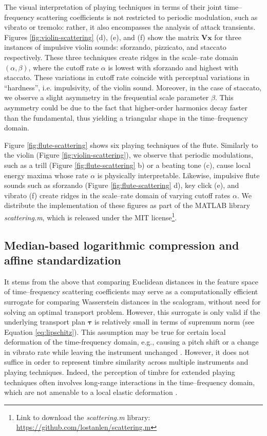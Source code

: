 \documentclass{bmcart}
\makeatletter
\newcommand*{\eg}{e.g.,\@\xspace}
\makeatother
\begin{document}
The visual interpretation of playing techniques in terms of their joint time--frequency scattering coefficients is not restricted to periodic modulation, such as vibrato or tremolo: rather, it also encompasses the analysis of attack transients.
Figures \ref{fig:violin-scattering} (d), (e), and (f) show the matrix $\mathbf{V}\boldsymbol{x}$ for three instances of impulsive violin sounds: sforzando, pizzicato, and staccato respectively.
These three techniques create ridges in the scale--rate domain $(\alpha, \beta)$, where the cutoff rate $\alpha$ is lowest with sforzando and highest with staccato.
These variations in cutoff rate coincide with perceptual variations in ``hardness'', i.e. impulsivity, of the violin sound.
Moreover, in the case of staccato, we observe a slight asymmetry in the frequential scale parameter $\beta$.
This asymmetry could be due to the fact that higher-order harmonics decay faster than the fundamental, thus yielding a triangular shape in the time--frequency domain.

Figure \ref{fig:flute-scattering} shows six playing techniques of the flute.
Similarly to the violin (Figure \ref{fig:violin-scattering}), we observe that periodic modulations, such as a trill (Figure \ref{fig:flute-scattering} b) or a beating tone (c), cause local energy maxima whose rate $\alpha$ is physically interpretable.
Likewise, impulsive flute sounds such as sforzando (Figure \ref{fig:flute-scattering} d), key click (e), and vibrato (f) create ridges in the scale--rate domain of varying cutoff rates $\alpha$.
We distribute the implementation of these figures as part of the MATLAB library \emph{scattering.m}, which is released under the MIT license\footnote{Link to download the \emph{scattering.m} library: \url{https://github.com/lostanlen/scattering.m}}.

\subsection*{Median-based logarithmic compression and affine standardization}
\label{sec:gaussianization}

It stems from the above that comparing Euclidean distances in the feature space of time--frequency scattering coefficients may serve as a computationally efficient surrogate for comparing Wasserstein distances in the scalogram, without need for solving an optimal transport problem.
However, this surrogate is only valid if the underlying transport plan $\boldsymbol{\tau}$ is relatively small  in terms of supremum norm (see Equation \ref{eq:lipschitz}).
This assumption may be true for certain local deformation of the time-frequency domain, \eg{} causing a pitch shift or a change in vibrato rate while leaving the instrument unchanged \cite{anden2012scattering}.
However, it does not suffice in order to represent timbre similarity across multiple instruments and playing techniques.
Indeed, the perception of timbre for extended playing techniques often involves long-range interactions in the time--frequency domain, which are not amenable to a local elastic deformation \cite{lostanlen2018extended}.
\end{document}
